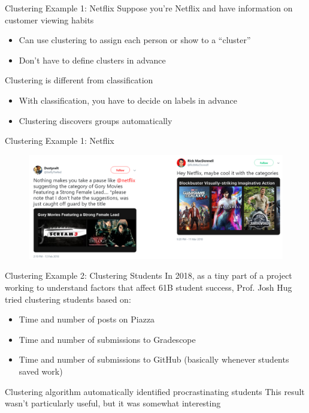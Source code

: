 \documentclass[aspectratio=169]{../latex_main/tntbeamer}  %
\begin{document}
	
	
	\begin{frame}{Clustering Example 1: Netflix}
	    Suppose you’re Netflix and have information on customer viewing habits
	    \begin{itemize}
	        \item Can use clustering to assign each person or show to a “cluster”
	        \item Don’t have to define clusters in advance
	    \end{itemize}
	    \bigskip
	    Clustering is different from classification
	    \begin{itemize}
	        \item With classification, you have to decide on labels in advance
	        \item Clustering discovers groups automatically
	    \end{itemize}
	\end{frame}
	
	
	\begin{frame}{Clustering Example 1: Netflix}
	    \begin{figure}
	        \centering
	        \includegraphics[scale=.4]{Bild5}
	    \end{figure}
	\end{frame}
	
	
	
	\begin{frame}{Clustering Example 2: Clustering Students}
	    In 2018, as a tiny part of a project working to understand factors that affect 61B student success, Prof. Josh Hug tried clustering students based on:
	    \begin{itemize}
	        \item Time and number of posts on Piazza
	        \item Time and number of submissions to Gradescope
	        \item Time and number of submissions to GitHub (basically whenever students saved work)
	    \end{itemize}
	    \bigskip
	    Clustering algorithm automatically identified procrastinating students
	    \bigskip
	    This result wasn’t particularly useful, but it was somewhat interesting

	\end{frame}
	
\end{document}
